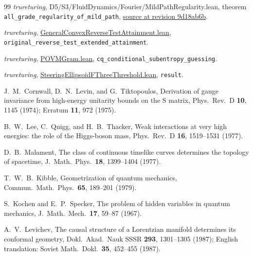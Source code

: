 \documentclass[aps,pra,onecolumn,superscriptaddress,nofootinbib,10pt]{revtex4-2}
\theoremstyle{definition}
\theoremstyle{remark}
\begin{document}
\begin{thebibliography}{99}
 \emph{trureturing}, D5/S3/FluidDynamics/Fourier/MildPathRegularity.lean, theorem \texttt{all\_grade\_regularity\_of\_mild\_path}, \href{https://github.com/the-omega-institute/trureturing/blob/9d18ab6b4d228a968377db110b46198742421a3d/D5/S3/FluidDynamics/Fourier/MildPathRegularity.lean#L28}{source at revision 9d18ab6b}.

 \emph{trureturing}, \href{https://github.com/the-omega-institute/trureturing/blob/9d18ab6b4d228a968377db110b46198742421a3d/D5/S3/Quantum/Divergence/GeneralConvexReverseTestAttainment.lean}{GeneralConvexReverseTestAttainment.lean}, \texttt{original\_reverse\_test\_extended\_attainment}.

 \emph{trureturing}, \href{https://github.com/the-omega-institute/trureturing/blob/9d18ab6b4d228a968377db110b46198742421a3d/D5/S3/Quantum/Subentropy/POVMGram.lean}{POVMGram.lean}, \texttt{cq\_conditional\_subentropy\_guessing}.

 \emph{trureturing}, \href{https://github.com/the-omega-institute/trureturing/blob/9d18ab6b4d228a968377db110b46198742421a3d/D5/S3/Quantum/Contextuality/SteeringEllipsoidFThreeThreshold.lean}{SteeringEllipsoidFThreeThreshold.lean}, \texttt{result}.

 J.~M.~Cornwall, D.~N.~Levin, and G.~Tiktopoulos, Derivation of gauge invariance from high-energy unitarity bounds on the S matrix, Phys.\ Rev.\ D \textbf{10}, 1145 (1974); Erratum \textbf{11}, 972 (1975).

 B.~W.~Lee, C.~Quigg, and H.~B.~Thacker, Weak interactions at very high energies: the role of the Higgs-boson mass, Phys.\ Rev.\ D \textbf{16}, 1519--1531 (1977).

 D.~B.~Malament, The class of continuous timelike curves determines the topology of spacetime, J.\ Math.\ Phys.\ \textbf{18}, 1399--1404 (1977).

 T.~W.~B.~Kibble, Geometrization of quantum mechanics, Commun.\ Math.\ Phys.\ \textbf{65}, 189--201 (1979).

 S.~Kochen and E.~P.~Specker, The problem of hidden variables in quantum mechanics, J.\ Math.\ Mech.\ \textbf{17}, 59--87 (1967).

 A.~V.~Levichev, The causal structure of a Lorentzian manifold determines its conformal geometry, Dokl.\ Akad.\ Nauk SSSR \textbf{293}, 1301--1305 (1987); English translation: Soviet Math.\ Dokl.\ \textbf{35}, 452--455 (1987). %


\end{thebibliography}
\end{document}
